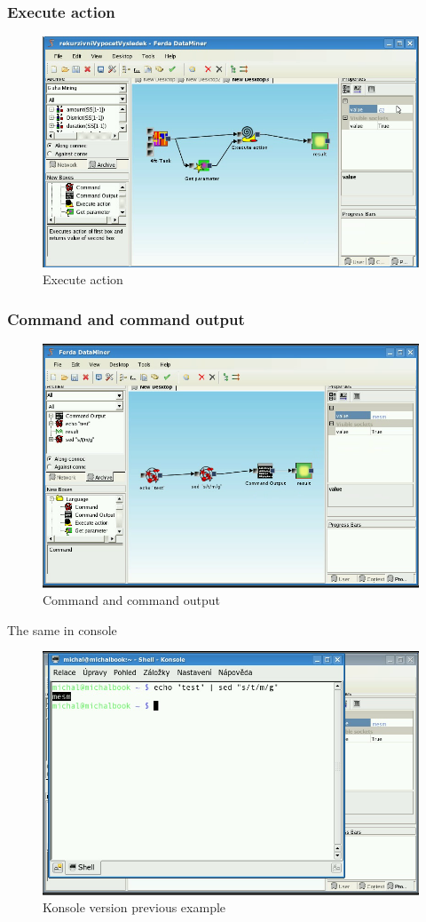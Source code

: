 \documentclass[a4paper,12pt]{book}
\begin{document}
\subsubsection{Execute action}
\begin{figure}
\includegraphics[width=12cm]{executeAction2.png}
	\caption{Execute action}
\end{figure}

\subsubsection{Command and command output}
\begin{figure}
	\includegraphics[width=12cm]{command2.png}
	\caption{Command and command output}
\end{figure}

The same in console
\begin{figure}
	\includegraphics[width=12cm]{command3.png}
	\caption{Konsole version previous example}
\end{figure}
\end{document}
